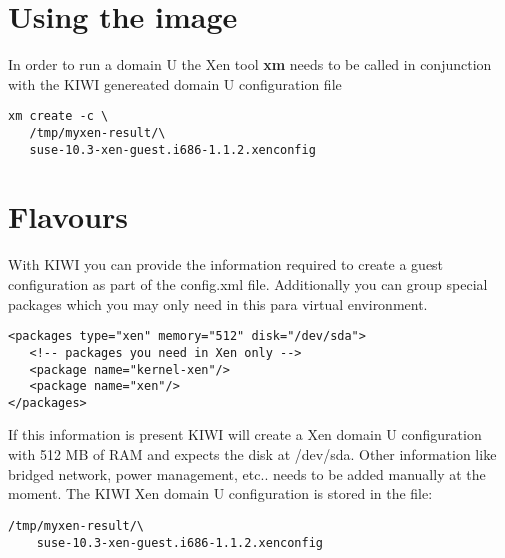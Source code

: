 \section{Using the image}

In order to run a domain U the Xen tool \textbf{xm} needs to be called
in conjunction with the KIWI genereated domain U configuration file

\begin{Command}{13cm}
\begin{verbatim}
xm create -c \
   /tmp/myxen-result/\
   suse-10.3-xen-guest.i686-1.1.2.xenconfig
\end{verbatim}
\end{Command}

\section{Flavours}

With KIWI you can provide the information
required to create a guest configuration as part of the config.xml
file. Additionally you can group special packages which you may only
need in this para virtual environment.

\begin{Command}{13cm}
\begin{verbatim}
<packages type="xen" memory="512" disk="/dev/sda">
   <!-- packages you need in Xen only -->
   <package name="kernel-xen"/>
   <package name="xen"/>
</packages>
\end{verbatim}
\end{Command}

If this information is present KIWI will create a Xen domain U
configuration with 512 MB of RAM and expects the disk at /dev/sda.
Other information like bridged network, power management, etc..
needs to be added manually at the moment. The KIWI Xen
domain U configuration is stored in the file:

\begin{Command}{13cm}
\begin{verbatim}
/tmp/myxen-result/\
    suse-10.3-xen-guest.i686-1.1.2.xenconfig
\end{verbatim}
\end{Command}
